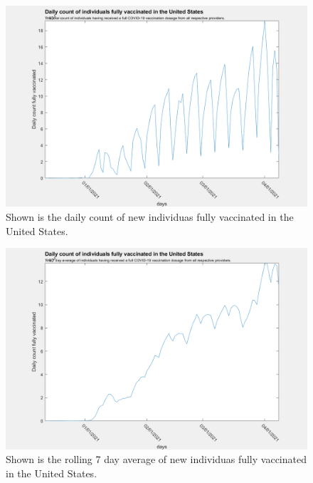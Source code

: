 \documentclass[twoside]{article}
\begin{document}
\begin{multicols}{2}
\begin{figure}[H]
	\includegraphics[width=\linewidth]{images/usa_daily_fully_vaccinated_unprocessed.png}
	\caption{Shown is the daily count of new individuas fully vaccinated in the United States. }
	\label{fig:images/usa_daily_fully_vaccinated_unprocessedLabel}
\end{figure}

\begin{figure}[H]
	\includegraphics[width=\linewidth]{images/usa_daily_fully_vaccinated_processed.png}
	\caption{Shown is the rolling 7 day average of new individuas fully vaccinated in the United States.}
	\label{fig:images/usa_daily_fully_vaccinated_processedLabel}
\end{figure}


\end{multicols}
\end{document}
